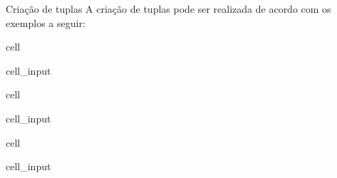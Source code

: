 \documentclass[letterpaper,10pt,english]{jupyterBook}
\begin{document}
\sphinxAtStartPar
Criação de tuplas
A criação de tuplas pode ser realizada de acordo com os exemplos a seguir:

\begin{sphinxuseclass}{cell}\begin{sphinxVerbatimInput}

\begin{sphinxuseclass}{cell_input}
\begin{sphinxVerbatim}[commandchars=\\\{\}]
  
\end{sphinxVerbatim}

\end{sphinxuseclass}\end{sphinxVerbatimInput}

\end{sphinxuseclass}
\begin{sphinxuseclass}{cell}\begin{sphinxVerbatimInput}

\begin{sphinxuseclass}{cell_input}
\begin{sphinxVerbatim}[commandchars=\\\{\}]
     
\end{sphinxVerbatim}

\end{sphinxuseclass}\end{sphinxVerbatimInput}

\end{sphinxuseclass}
\begin{sphinxuseclass}{cell}\begin{sphinxVerbatimInput}

\begin{sphinxuseclass}{cell_input}
\begin{sphinxVerbatim}[commandchars=\\\{\}]
    
\end{sphinxVerbatim}

\end{sphinxuseclass}\end{sphinxVerbatimInput}

\end{sphinxuseclass}
\end{document}
